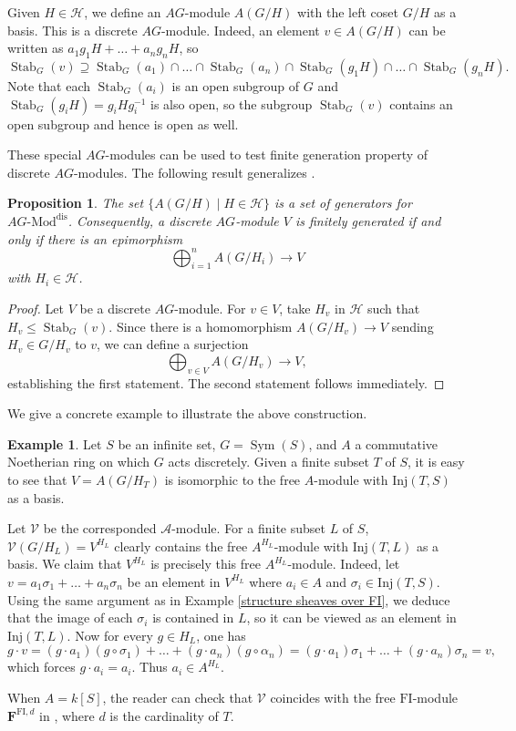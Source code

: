 \documentclass[11pt, reqno]{amsart}
\theoremstyle{plain}
\newtheorem{proposition}[theorem]{Proposition}
\numberwithin{equation}{section}
\theoremstyle{definition}
\newtheorem{example}[theorem]{Example}
\newcommand{\Mod}{{\textrm{-}\mathrm{Mod}}}
\newcommand{\Inj}{{\mathrm{Inj}}}
\DeclareMathOperator{\Sym}{Sym}
\DeclareMathOperator{\Stab}{Stab}
\newcommand{\FI}{{\mathrm{FI}}}
\newcommand{\dis}{{\mathrm{dis}}}
\begin{document}
Given $H \in \mathcal{H}$, we define an $AG$-module $A(G/H)$ with the left coset $G/H$ as a basis. This is a discrete $AG$-module. Indeed, an element $v \in A(G/H)$ can be written as $a_1 g_1H + \ldots + a_n g_n H$, so
\[
\Stab_G(v) \supseteq \Stab_G(a_1) \cap \ldots \cap \Stab_G(a_n) \cap \Stab_G(g_1H) \cap \ldots \cap \Stab_G(g_n H).
\]
Note that each $\Stab_G(a_i)$ is an open subgroup of $G$ and $\Stab_G(g_iH) = g_iHg_i^{-1}$ is also open, so the subgroup $\Stab_G(v)$ contains an open subgroup and hence is open as well.

These special $AG$-modules can be used to test finite generation property of discrete $AG$-modules. The following result generalizes \cite[Proposition 3.18]{NR1}.

\begin{proposition} \label{generators of modules}
The set $\{ A(G/H) \mid H \in \mathcal{H} \}$ is a set of generators for $AG \Mod^{\dis}$. Consequently, a discrete $AG$-module $V$ is finitely generated if and only if there is an epimorphism
\[
\bigoplus_{i=1}^n A(G/H_i) \to V
\]
with $H_i \in \mathcal{H}$.
\end{proposition}

\begin{proof}
Let $V$ be a discrete $AG$-module. For $v \in V$, take $H_v$ in $\mathcal{H}$ such that $H_v \leqslant \Stab_G(v)$. Since there is a homomorphism $A(G/H_v) \to V$ sending $H_v \in G/H_v$ to $v$, we can define a surjection
\[
\bigoplus_{v \in V} A(G/H_v) \longrightarrow V,
\]
establishing the first statement. The second statement follows immediately.
\end{proof}

We give a concrete example to illustrate the above construction.

\begin{example} \label{coincidence}
Let $S$ be an infinite set, $G = \Sym(S)$, and $A$ a commutative Noetherian ring on which $G$ acts discretely. Given a finite subset $T$ of $S$, it is easy to see that $V = A(G/H_T)$ is isomorphic to the free $A$-module with $\Inj(T, S)$ as a basis.

Let $\mathcal{V}$ be the corresponded $\mathcal{A}$-module. For a finite subset $L$ of $S$, $\mathcal{V}(G/H_L) = V^{H_L}$ clearly contains the free $A^{H_L}$-module with $\Inj(T, L)$ as a basis. We claim that $V^{H_L}$ is precisely this free $A^{H_L}$-module. Indeed, let $v = a_1 \sigma_1 + \ldots + a_n \sigma_n$ be an element in $V^{H_L}$ where $a_i \in A$ and $\sigma_i \in \Inj(T, S)$. Using the same argument as in Example \ref{structure sheaves over FI}, we deduce that the image of each $\sigma_i$ is contained in $L$, so it can be viewed as an element in $\Inj(T, L)$. Now for every $g \in H_L$, one has
\[
g \cdot v = (g \cdot a_1) (g \circ \sigma_1) + \ldots + (g \cdot a_n) (g \circ \alpha_n) = (g \cdot a_1) \sigma_1 + \ldots + (g \cdot a_n) \sigma_n = v,
\]
which forces $g \cdot a_i = a_i$. Thus $a_i \in A^{H_L}$.

When $A = k[S]$, the reader can check that $\mathcal{V}$ coincides with the free $\FI$-module $\mathbf{F}^{\FI, d}$ in \cite[Definition 3.16]{NR1}, where $d$ is the cardinality of $T$.
\end{example}
\end{document}
